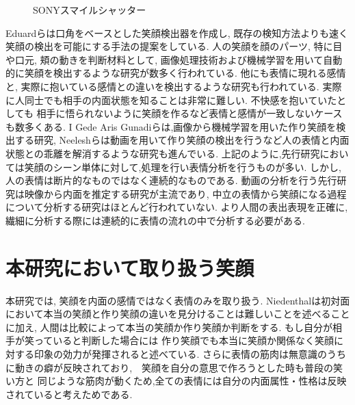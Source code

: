 \begin{figure}[htbp]
    \begin{center}
    \end{center}
    \caption{SONYスマイルシャッター}
    \label{fig:sony_smile_shutter}
\end{figure}

Eduardらは口角をベースとした笑顔検出器を作成し,
既存の検知方法よりも速く笑顔の検出を可能にする手法の提案をしている\cite{EduardRoyce}.
人の笑顔を顔のパーツ, 特に目や口元, 頬の動きを判断材料として, 画像処理技術および機械学習を用いて自動的に笑顔を検出するような研究が数多く行われている.
他にも表情に現れる感情と, 実際に抱いている感情との違いを検出するような研究も行われている.
実際に人同士でも相手の内面状態を知ることは非常に難しい. 不快感を抱いていたとしても 相手に悟られないように笑顔を作るなど表情と感情が一致しないケースも数多くある.
I Gede Aris Gunadiらは,画像から機械学習を用いた作り笑顔を検出する研究\cite{IGedeArisGunadi}, Neeleshらは動画を用いて作り笑顔の検出\cite{NeeleshBhakt}を行うなど人の表情と内面状態との乖離を解消するような研究も進んでいる.
上記のように,先行研究においては笑顔のシーン単体に対して,処理を行い表情分析を行うものが多い.
しかし, 人の表情は断片的なものではなく連続的なものである.
動画の分析を行う先行研究は映像から内面を推定する研究が主流であり,
中立の表情から笑顔になる過程について分析する研究はほとんど行われていない.
より人間の表出表現を正確に, 繊細に分析する際には連続的に表情の流れの中で分析する必要がある.


\section{本研究において取り扱う笑顔}
本研究では, 笑顔を内面の感情ではなく表情のみを取り扱う. %
Niedenthalは初対面において本当の笑顔と作り笑顔の違いを見分けることは難しいことを述べることに加え,
人間は比較によって本当の笑顔か作り笑顔か判断をする. もし自分が相手が笑っていると判断した場合には
作り笑顔でも本当に笑顔か関係なく笑顔に対する印象の効力が発揮されると述べている\cite{niedenthal2010simulation}.
さらに表情の筋肉は無意識のうちに動きの癖が反映されており,　笑顔を自分の意思で作ろうとした時も普段の笑い方と
同じような筋肉が動くため,全ての表情には自分の内面属性・性格は反映されていると考えためである.

